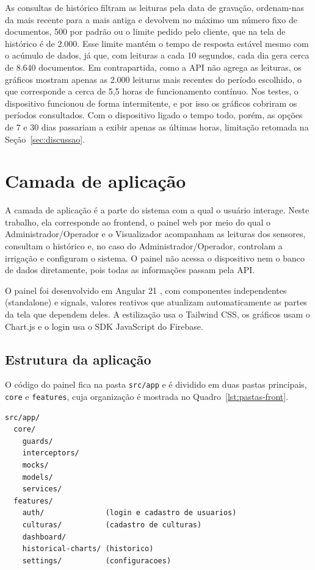 As consultas de histórico filtram as leituras pela data de gravação, ordenam-nas da mais recente para a mais antiga e devolvem no máximo um número fixo de documentos, 500 por padrão ou o limite pedido pelo cliente, que na tela de histórico é de 2.000. Esse limite mantém o tempo de resposta estável mesmo com o acúmulo de dados, já que, com leituras a cada 10 segundos, cada dia gera cerca de 8.640 documentos. Em contrapartida, como a API não agrega as leituras, os gráficos mostram apenas as 2.000 leituras mais recentes do período escolhido, o que corresponde a cerca de 5,5 horas de funcionamento contínuo. Nos testes, o dispositivo funcionou de forma intermitente, e por isso os gráficos cobriram os períodos consultados. Com o dispositivo ligado o tempo todo, porém, as opções de 7 e 30 dias passariam a exibir apenas as últimas horas, limitação retomada na Seção~\ref{sec:discussao}.

\section{Camada de aplicação}
\label{sec:frontend}

A camada de aplicação é a parte do sistema com a qual o usuário interage. Neste trabalho, ela corresponde ao frontend, o painel web por meio do qual o Administrador/Operador e o Visualizador acompanham as leituras dos sensores, consultam o histórico e, no caso do Administrador/Operador, controlam a irrigação e configuram o sistema. O painel não acessa o dispositivo nem o banco de dados diretamente, pois todas as informações passam pela API.

O painel foi desenvolvido em Angular 21 \cite{angular2026}, com componentes independentes (standalone) e signals, valores reativos que atualizam automaticamente as partes da tela que dependem deles. A estilização usa o Tailwind CSS, os gráficos usam o Chart.js e o login usa o SDK JavaScript do Firebase.

\subsection{Estrutura da aplicação}

O código do painel fica na pasta \texttt{src/app} e é dividido em duas pastas principais, \texttt{core} e \texttt{features}, cuja organização é mostrada no Quadro~\ref{lst:pastas-front}.

\vspace{0.6\baselineskip}
\noindent\begin{minipage}{\linewidth}
\begin{lstlisting}[language={}, caption={Estrutura de pastas do painel web}, label={lst:pastas-front}]
src/app/
  core/
    guards/
    interceptors/
    mocks/
    models/
    services/
  features/
    auth/              (login e cadastro de usuarios)
    culturas/          (cadastro de culturas)
    dashboard/
    historical-charts/ (historico)
    settings/          (configuracoes)
\end{lstlisting}
\vspace{-0.5\baselineskip}
\end{minipage}
\medskip

